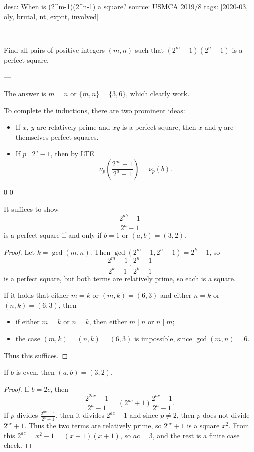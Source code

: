 desc: When is (2^m-1)(2^n-1) a square?
source: USMCA 2019/8
tags: [2020-03, oly, brutal, nt, expnt, involved]

---

Find all pairs of positive integers $(m,n)$ such that $(2^m-1)(2^n-1)$ is a perfect square.

---

The answer is $m=n$ or $\{m,n\}=\{3,6\}$, which clearly work.
\begin{remark}
    To complete the inductions, there are two prominent ideas:
    \begin{itemize}
        \item If $x$, $y$ are relatively prime and $xy$ is a perfect square, then $x$ and $y$ are themselves perfect squares.
        \item If $p\mid2^a-1$, then by LTE \[\nu_p\left(\frac{2^{ab}-1}{2^a-1}\right)=\nu_p(b).\]
    \end{itemize}
\end{remark}
\setcounter{claim}0
\setcounter{lemma}0
\begin{lemma}
    It suffices to show \[\dfrac{2^{ab}-1}{2^a-1}\]
    is a perfect square if and only if $b=1$ or $(a,b)=(3,2)$.
\end{lemma}
\begin{proof}
    Let $k=\gcd(m,n)$. Then $\gcd(2^m-1,2^n-1)=2^k-1$, so \[\frac{2^m-1}{2^k-1}\cdot\frac{2^n-1}{2^k-1}\]
    is a perfect square, but both terms are relatively prime, so each is a square.

    If it holds that either $m=k$ or $(m,k)=(6,3)$ and either $n=k$ or $(n,k)=(6,3)$, then
    \begin{itemize}[itemsep=0em]
        \item if either $m=k$ or $n=k$, then either $m\mid n$ or $n\mid m$;
        \item the case $(m,k)=(n,k)=(6,3)$ is impossible, since $\gcd(m,n)=6$.
    \end{itemize}
    Thus this suffices.
\end{proof}
\begin{lemma}
    If $b$ is even, then $(a,b)=(3,2)$.
\end{lemma}
\begin{proof}
    If $b=2c$, then \[\frac{2^{2ac}-1}{2^a-1}=\left(2^{ac}+1\right)\frac{2^{ac}-1}{2^a-1}.\]
    If $p$ divides $\tfrac{2^{ac}-1}{2^a-1}$, then it divides $2^{ac}-1$ and since $p\ne2$, then $p$ does not divide $2^{ac}+1$. Thus the two terms are relatively prime, so $2^{ac}+1$ is a square $x^2$. From this $2^{ac}=x^2-1=(x-1)(x+1)$, so $ac=3$, and the rest is a finite case check.
\end{proof}

